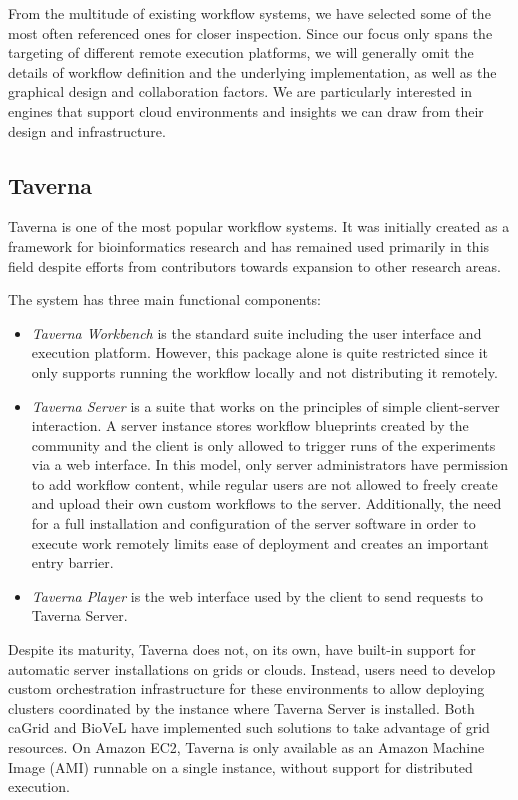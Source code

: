 \documentclass[11pt,a4paper]{report}
\begin{document}
From the multitude of existing workflow systems, we have selected some of the most often referenced ones for closer inspection. Since our focus only spans the targeting of different remote execution platforms, we will generally omit the details of workflow definition and the underlying implementation, as well as the graphical design and collaboration factors. We are particularly interested in engines that support cloud environments and insights we can draw from their design and infrastructure.

\subsection{Taverna}

Taverna \cite{Wolstencroft2013} is one of the most popular workflow systems. It was initially created as a framework for bioinformatics research and has remained used primarily in this field despite efforts from contributors towards expansion to other research areas.

The system has three main functional components:
\begin{itemize}
	\item \textit{Taverna Workbench} is the standard suite including the user interface and execution platform. However, this package alone is quite restricted since it only supports running the workflow locally and not distributing it remotely.
	\item \textit{Taverna Server} is a suite that works on the principles of simple client-server interaction. A server instance stores workflow blueprints created by the community and the client is only allowed to trigger runs of the experiments via a web interface. In this model, only server administrators have permission to add workflow content, while regular users are not allowed to freely create and upload their own custom workflows to the server. Additionally, the need for a full installation and configuration of the server software in order to execute work remotely limits ease of deployment and creates an important entry barrier.
	\item \textit{Taverna Player} is the web interface used by the client to send requests to Taverna Server.
\end{itemize}

Despite its maturity, Taverna does not, on its own, have built-in support for automatic server installations on grids or clouds. Instead, users need to develop custom orchestration infrastructure for these environments to allow deploying clusters coordinated by the instance where Taverna Server is installed. Both caGrid \cite{caGrid} and BioVeL \cite{BioVeL} have implemented such solutions \cite{TavernaGrid, Donvito} to take advantage of grid resources. On Amazon EC2, Taverna is only available as an Amazon Machine Image (AMI) runnable on a single instance, without support for distributed execution.
\end{document}
